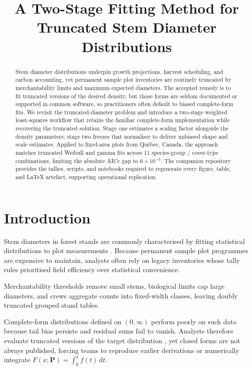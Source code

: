 \documentclass[12pt]{article}
\title{A Two-Stage Fitting Method for Truncated Stem Diameter Distributions}
\date{}
\begin{document}
\maketitle



\begin{abstract}
Stem diameter distributions underpin growth projections, harvest scheduling, and carbon accounting, yet permanent sample plot inventories are routinely truncated by merchantability limits and maximum expected diameters. The accepted remedy is to fit truncated versions of the desired density, but those forms are seldom documented or supported in common software, so practitioners often default to biased complete-form fits. We revisit the truncated-diameter problem and introduce a two-stage weighted least-squares workflow that retains the familiar complete-form implementation while recovering the truncated solution. Stage one estimates a scaling factor alongside the density parameters; stage two freezes that normaliser to deliver unbiased shape and scale estimates. Applied to fixed-area plots from Qu\'ebec, Canada, the approach matches truncated Weibull and gamma fits across 11 species-group / cover-type combinations, limiting the absolute AICc gap to $6 \times 10^{-3}$. The companion repository provides the tallies, scripts, and notebooks required to regenerate every figure, table, and \LaTeX{} artefact, supporting operational replication.
\end{abstract}

\section{Introduction}
\label{sec:introduction}

Stem diameters in forest stands are commonly characterised by fitting statistical distributions to plot measurements \citep{bailey1973quantifying, hyink1983generalized}. Because permanent sample plot programmes are expensive to maintain, analysts often rely on legacy inventories whose tally rules prioritised field efficiency over statistical convenience.

Merchantability thresholds remove small stems, biological limits cap large diameters, and crews aggregate counts into fixed-width classes, leaving doubly truncated grouped stand tables.

Complete-form distributions defined on $(0, \infty)$ perform poorly on such data because tail bias persists and residual sums fail to vanish. Analysts therefore evaluate truncated versions of the target distribution \citep{zutter1986characterizing}, yet closed forms are not always published, forcing teams to reproduce earlier derivations \citep{mittal1989estimating, hannon1999estimation, hegde1989estimation, ahmad2001moments, wingo1989left} or numerically integrate $F(x; \boldsymbol{P}) = \int_0^x f(t)\,\mathrm{d}t$.
\end{document}

